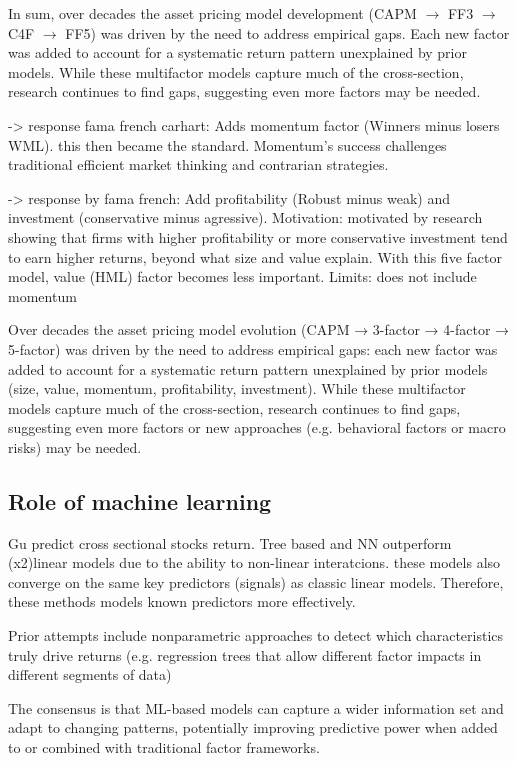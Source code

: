 In sum, over decades the asset pricing model development (CAPM $\rightarrow$ FF3 $\rightarrow$ C4F $\rightarrow$ FF5) was driven by the need to address empirical gaps. Each new factor was added to account for a systematic return pattern unexplained by prior models. While these multifactor models capture much of the cross-section, research continues to find gaps, suggesting even more factors may be needed.







-> response fama french carhart: Adds momentum factor (Winners minus losers WML). this then became the standard.  Momentum’s success challenges traditional efficient market thinking and contrarian strategies.


-> response by fama french: Add profitability (Robust minus weak) and investment (conservative minus agressive). Motivation:  motivated by research showing that firms with higher profitability or more conservative investment tend to earn higher returns, beyond what size and value explain. With this five factor model, value (HML) factor becomes less important. Limits: does not include momentum


Over decades the asset pricing model evolution (CAPM → 3-factor → 4-factor → 5-factor) was driven by the need to address empirical gaps: each new factor was added to account for a systematic return pattern unexplained by prior models (size, value, momentum, profitability, investment). While these multifactor models capture much of the cross-section, research continues to find gaps, suggesting even more factors or new approaches (e.g. behavioral factors or macro risks) may be needed.


\subsection{Role of machine learning}
Gu predict cross sectional stocks return. Tree based and NN outperform  (x2)linear models due to the ability to non-linear interatcions. these models also converge on the same key predictors (signals) as classic linear models. Therefore, these methods models known predictors more effectively.

Prior attempts include nonparametric approaches to detect which characteristics truly drive returns (e.g. regression trees that allow different factor impacts in different segments of data)

The consensus is that ML-based models can capture a wider information set and adapt to changing patterns, potentially improving predictive power when added to or combined with traditional factor frameworks.

